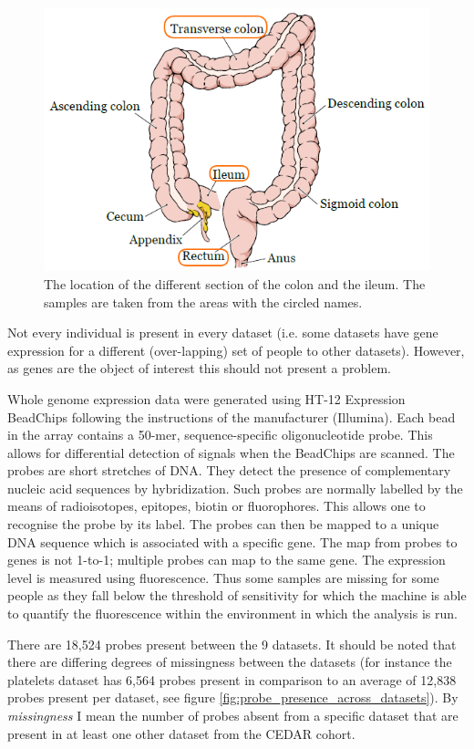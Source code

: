 \documentclass[12pt]{article} %
\begin{document}
	\begin{figure}[h]
		\centering
		\includegraphics[scale=0.55]{Images/colon_highlight.png}
		\caption{The location of the different section of the colon and the ileum. The samples are taken from the areas with the circled names.}
		\label{fig:colon_location}
	\end{figure}
	

	Not every individual is present in every dataset (i.e. some datasets have gene expression for a different (over-lapping) set of people to other datasets). However, as genes are the object of interest this should not present a problem.
	
	Whole genome expression data were generated using HT-12 Expression BeadChips following the instructions of the manufacturer (Illumina). Each bead in the array contains a 50-mer, sequence-specific oligonucleotide probe. This allows for differential detection of signals when the BeadChips are scanned. The probes are short stretches of DNA. They detect the presence of complementary nucleic acid sequences by hybridization. Such probes are normally labelled by the means of radioisotopes, epitopes, biotin or fluorophores. This allows one to recognise the probe by its label. The probes can then be mapped to a unique DNA sequence which is associated with a specific gene. The map from probes to genes is not 1-to-1; multiple probes can map to the same gene. The expression level is measured using fluorescence. Thus some samples are missing for some people as they fall below the threshold of sensitivity for which the machine is able to quantify the fluorescence within the environment in which the analysis is run.
	
	There are 18,524 probes present between the 9 datasets. It should be noted that there are differing degrees of missingness between the datasets (for instance the platelets dataset has 6,564 probes present in comparison to an average of 12,838 probes present per dataset, see figure \ref{fig:probe_presence_across_datasets}). By \emph{missingness} I mean the number of probes absent from a specific dataset that are present in at least one other dataset from the CEDAR cohort.
	
\end{document}
